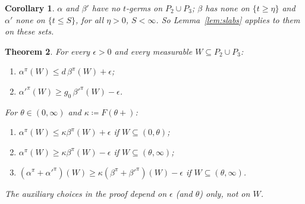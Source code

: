 \documentclass[11pt]{article}
\newtheorem{theorem}{Theorem}
\newtheorem{corollary}[theorem]{Corollary}
\theoremstyle{definition}\newtheorem{definition}[theorem]{Definition}
\theoremstyle{remark}\newtheorem{remark}[theorem]{Remark}
\begin{document}
\begin{corollary}\label{cor:tstrong}
$\alpha$ and $\beta'$ have no $t$-germs on $P_2\cup P_3$; $\beta$ has none on
$\{t\ge\eta\}$ and $\alpha'$ none on $\{t\le S\}$, for all $\eta>0$, $S<\infty$.
So Lemma~\ref{lem:slabs} applies to them on these sets.
\end{corollary}

\begin{theorem}\label{thm:pureratio}
For every $\epsilon>0$ and every measurable $W\subseteq P_2\cup P_3$:
\begin{enumerate}[label=(\roman*),leftmargin=*,itemsep=1pt]
\item $\alpha^\pi(W)\le d\,\beta^\pi(W)+\epsilon$;
\item $\alpha'^\pi(W)\ge g_0\,\beta'^\pi(W)-\epsilon$.
\end{enumerate}
For $\theta\in(0,\infty)$ and $\kappa\coloneqq F(\theta+)$:
\begin{enumerate}[label=(\roman*),leftmargin=*,itemsep=1pt,start=3]
\item $\alpha^\pi(W)\le\kappa\beta^\pi(W)+\epsilon$ if $W\subseteq(0,\theta)$;
\item $\alpha^\pi(W)\ge\kappa\beta^\pi(W)-\epsilon$ if $W\subseteq(\theta,\infty)$;
\item $(\alpha^\pi+\alpha'^\pi)(W)\ge\kappa(\beta^\pi+\beta'^\pi)(W)-\epsilon$ if
$W\subseteq(\theta,\infty)$.
\end{enumerate}
The auxiliary choices in the proof depend on $\epsilon$ (and $\theta$) only,
not on $W$.
\end{theorem}
\end{document}
